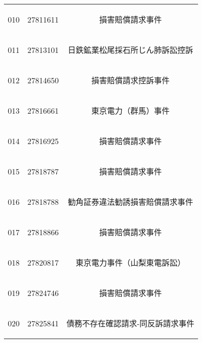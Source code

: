 \begin{table}[!h]
\begin{tabular}{ccc}
010&27811611&\begin{CJK}{UTF8}{ipxm}損害賠償請求事件\end{CJK}\\
011&27813101&\begin{CJK}{UTF8}{ipxm}日鉄鉱業松尾採石所じん肺訴訟控訴\end{CJK}\\
012&27814650&\begin{CJK}{UTF8}{ipxm}損害賠償請求控訴事件\end{CJK}\\
013&27816661&\begin{CJK}{UTF8}{ipxm}東京電力（群馬）事件\end{CJK}\\
014&27816925&\begin{CJK}{UTF8}{ipxm}損害賠償請求事件\end{CJK}\\
015&27818787&\begin{CJK}{UTF8}{ipxm}損害賠償請求事件\end{CJK}\\
016&27818788&\begin{CJK}{UTF8}{ipxm}勧角証券違法勧誘損害賠償請求事件\end{CJK}\\
017&27818866&\begin{CJK}{UTF8}{ipxm}損害賠償請求事件\end{CJK}\\
018&27820817&\begin{CJK}{UTF8}{ipxm}東京電力事件（山梨東電訴訟）\end{CJK}\\
019&27824746&\begin{CJK}{UTF8}{ipxm}損害賠償請求事件\end{CJK}\\
020&27825841&\begin{CJK}{UTF8}{ipxm}債務不存在確認請求-同反訴請求事件\end{CJK}\\
\hline
\end{tabular}
\end{table}